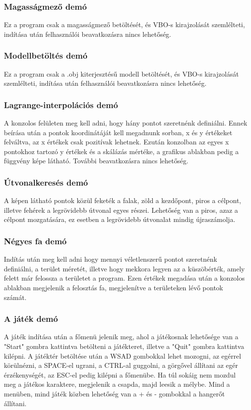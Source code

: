 \subsubsection{Magasságmező demó}

Ez a program csak a magasságmező betöltését, és VBO-s kirajzolását szemlélteti, indítása után felhasználói beavatkozásra nincs lehetőség.

\subsubsection{Modellbetöltés demó}

Ez a program csak a .obj kiterjesztésű modell betöltését, és VBO-s kirajzolását szemlélteti, indítása után felhasználói beavatkozásra nincs lehetőség.

\subsubsection{Lagrange-interpolációs demó}

A konzolos felületen meg kell adni, hogy hány pontot szeretnénk definiálni. Ennek beírása után a pontok koordinátáját kell megadnunk sorban, x és y értékeket felváltva, az x értékek csak pozitívak lehetnek. Ezután konzolban az egyes x pontokhoz tartozó y értékek és a skálázás mértéke, a grafikus ablakban pedig a függvény képe látható. További beavatkozásra nincs lehetőség.

\subsubsection{Útvonalkeresés demó}

A képen látható pontok közül feketék a falak, zöld a kezdőpont, piros a célpont, illetve fehérek a legrövidebb útvonal egyes részei. Lehetőség van a piros, azaz a célpont mozgatására, ez esetben a legrövidebb útvonalat mindig újraszámolja.

\subsubsection{Négyes fa demó}

Indítás után meg kell adni hogy mennyi véletlenszerű pontot szeretnénk definiálni, a terület méretét, illetve hogy mekkora legyen az a küszöbérték, amely felett már felossza a területet a program. Ezen értékek megadása után a konzolos ablakban megjelenik a felosztás fa, megjelenítve a területeken lévő pontok számát.

\subsubsection{A játék demó}

A játék indítása után a főmenü jelenik meg, ahol a játékosnak lehetősége van a "Start" gombra kattintva betölteni a játékteret, illetve a "Quit" gombra kattintva kilépni. A játéktér betöltése után a WSAD gombokkal lehet mozogni, az egérrel körülnézni, a SPACE-el ugrani, a CTRL-al guggolni, a görgővel állítani az egér érzékenységét, az ESC-el pedig kilépni a főmenübe. Ha túl sokáig nem mozdul meg a játékos karaktere, megjelenik a csapda, majd leesik a mélybe. Mind a menüben, mind játék közben lehetőség van a + és - gombokkal a hangerőt állítani.